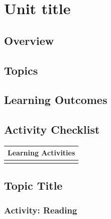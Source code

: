 \documentclass[
]{book}
\begin{document}
\hypertarget{unit-title-1}{%
\chapter{Unit title}\label{unit-title-1}}

\hypertarget{overview-1}{%
\section*{Overview}\label{overview-1}}

\hypertarget{topics-1}{%
\section*{Topics}\label{topics-1}}

\hypertarget{learning-outcomes-1}{%
\section*{Learning Outcomes}\label{learning-outcomes-1}}

\hypertarget{activity-checklist-1}{%
\section*{Activity Checklist}\label{activity-checklist-1}}

\begin{longtable}[]{@{}l@{}}
\toprule()
Learning Activities \\
\midrule()
\endhead
 \\
\bottomrule()
\end{longtable}

\hypertarget{topic-title-1}{%
\section*{Topic Title}\label{topic-title-1}}

\hypertarget{activity-reading}{%
\subsection*{Activity: Reading}\label{activity-reading}}

\begin{reflect}

\end{reflect}
\end{document}

